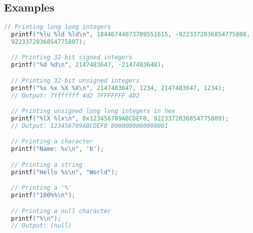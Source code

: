 \subsection*{Examples}
\begin{lstlisting}[language={C}, caption={Examples of printf usage in AstraKernel.}, label={lst:printf_examples}]
  // Printing long long integers
  printf("%lu %ld %ld\n", 18446744073709551615, -9223372036854775808, 
  9223372036854775807);

  // Printing 32-bit signed integers
  printf("%d %d\n", 2147483647, -2147483648);

  // Printing 32-bit unsigned integers
  printf("%x %x %X %X\n", 2147483647, 1234, 2147483647, 1234);
  // Output: 7fffffff 4d2 7FFFFFFF 4D2

  // Printing unsigned long long integers in hex
  printf("%lX %lx\n", 0x123456789ABCDEF0, 9223372036854775809);
  // Output: 123456789ABCDEF0 8000000000000001

  // Printing a character
  printf("Name: %c\n", 'b');

  // Printing a string
  printf("Hello %s\n", "World");

  // Printing a '%'
  printf("100%%\n");

  // Printing a null character
  printf("%\n");
  // Output: (null)
\end{lstlisting}
